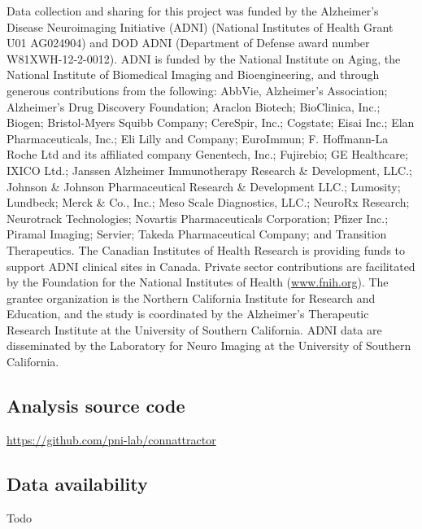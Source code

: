 \documentclass{article}
\begin{document}
Data collection and sharing for this project was funded by the Alzheimer's Disease
Neuroimaging Initiative (ADNI) (National Institutes of Health Grant U01 AG024904) and
DOD ADNI (Department of Defense award number W81XWH-12-2-0012). ADNI is funded
by the National Institute on Aging, the National Institute of Biomedical Imaging and
Bioengineering, and through generous contributions from the following: AbbVie, Alzheimer's
Association; Alzheimer's Drug Discovery Foundation; Araclon Biotech; BioClinica, Inc.;
Biogen; Bristol-Myers Squibb Company; CereSpir, Inc.; Cogstate; Eisai Inc.; Elan
Pharmaceuticals, Inc.; Eli Lilly and Company; EuroImmun; F. Hoffmann-La Roche Ltd and
its affiliated company Genentech, Inc.; Fujirebio; GE Healthcare; IXICO Ltd.; Janssen
Alzheimer Immunotherapy Research \& Development, LLC.; Johnson \& Johnson
Pharmaceutical Research \& Development LLC.; Lumosity; Lundbeck; Merck \& Co., Inc.;
Meso Scale Diagnostics, LLC.; NeuroRx Research; Neurotrack Technologies; Novartis
Pharmaceuticals Corporation; Pfizer Inc.; Piramal Imaging; Servier; Takeda Pharmaceutical
Company; and Transition Therapeutics. The Canadian Institutes of Health Research is
providing funds to support ADNI clinical sites in Canada. Private sector contributions are
facilitated by the Foundation for the National Institutes of Health (\href{http://www.fnih.org}{www.fnih.org}). The grantee
organization is the Northern California Institute for Research and Education, and the study is
coordinated by the Alzheimer's Therapeutic Research Institute at the University of Southern
California. ADNI data are disseminated by the Laboratory for Neuro Imaging at the
University of Southern California.

\subsection{Analysis source code}\label{Analysis source code}

\href{https://github.com/pni-lab/connattractor}{https://github.com/pni-lab/connattractor}

\subsection{Data availability}\label{Data availability}

Todo





\end{document}
